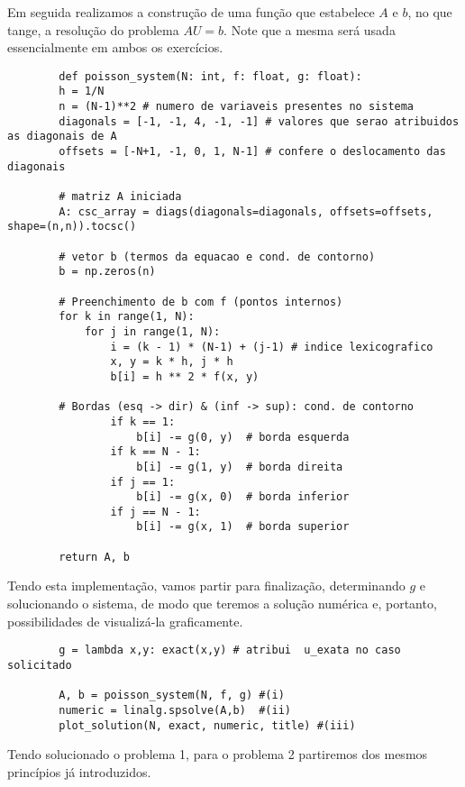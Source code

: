 \documentclass[column,amsmath,amssymb,floatfix]{revtex4}
\begin{document}
        
        Em seguida realizamos a construção de uma função que estabelece $A$ e $b$, no que tange, a resolução do problema $AU = b$. Note que a mesma será usada essencialmente em ambos os exercícios.

        \begin{lstlisting}
        def poisson_system(N: int, f: float, g: float):
        h = 1/N
        n = (N-1)**2 # numero de variaveis presentes no sistema
        diagonals = [-1, -1, 4, -1, -1] # valores que serao atribuidos as diagonais de A
        offsets = [-N+1, -1, 0, 1, N-1] # confere o deslocamento das diagonais
        
        # matriz A iniciada
        A: csc_array = diags(diagonals=diagonals, offsets=offsets, shape=(n,n)).tocsc()
        
        # vetor b (termos da equacao e cond. de contorno)
        b = np.zeros(n)
        
        # Preenchimento de b com f (pontos internos)
        for k in range(1, N):
            for j in range(1, N):
                i = (k - 1) * (N-1) + (j-1) # indice lexicografico
                x, y = k * h, j * h
                b[i] = h ** 2 * f(x, y)
        
        # Bordas (esq -> dir) & (inf -> sup): cond. de contorno
                if k == 1:
                    b[i] -= g(0, y)  # borda esquerda
                if k == N - 1:
                    b[i] -= g(1, y)  # borda direita
                if j == 1:
                    b[i] -= g(x, 0)  # borda inferior
                if j == N - 1:
                    b[i] -= g(x, 1)  # borda superior
        
        return A, b
        \end{lstlisting}
        
        Tendo esta implementação, vamos partir para finalização, determinando $g$ e solucionando o sistema, de modo que teremos a solução numérica e, portanto, possibilidades de visualizá-la graficamente.
        
        \begin{lstlisting}
        g = lambda x,y: exact(x,y) # atribui  u_exata no caso solicitado
        
        A, b = poisson_system(N, f, g) #(i)
        numeric = linalg.spsolve(A,b)  #(ii)
        plot_solution(N, exact, numeric, title) #(iii)   
        \end{lstlisting}

        Tendo solucionado o problema 1, para o problema 2 partiremos dos mesmos princípios já introduzidos.
        
\end{document}
